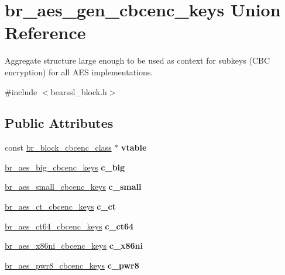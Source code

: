 \hypertarget{unionbr__aes__gen__cbcenc__keys}{}\section{br\+\_\+aes\+\_\+gen\+\_\+cbcenc\+\_\+keys Union Reference}
\label{unionbr__aes__gen__cbcenc__keys}


Aggregate structure large enough to be used as context for subkeys (C\+BC encryption) for all A\+ES implementations.  




{\ttfamily \#include $<$bearssl\+\_\+block.\+h$>$}

\subsection*{Public Attributes}
\begin{DoxyCompactItemize}
\item 
\mbox{\label{unionbr__aes__gen__cbcenc__keys_a5336f4cc210669a4cd5ead782a58d35b}} 
const \hyperlink{bearssl__block_8h_ad0ecff523e21a74dc1143dcfa52aa251}{br\+\_\+block\+\_\+cbcenc\+\_\+class} $\ast$ {\bfseries vtable}
\item 
\mbox{\label{unionbr__aes__gen__cbcenc__keys_aaa9182af4d52e3860792f1728b3b1086}} 
\hyperlink{structbr__aes__big__cbcenc__keys}{br\+\_\+aes\+\_\+big\+\_\+cbcenc\+\_\+keys} {\bfseries c\+\_\+big}
\item 
\mbox{\label{unionbr__aes__gen__cbcenc__keys_ae0a36c46c6fb6d19ccd215ed64338ebf}} 
\hyperlink{structbr__aes__small__cbcenc__keys}{br\+\_\+aes\+\_\+small\+\_\+cbcenc\+\_\+keys} {\bfseries c\+\_\+small}
\item 
\mbox{\label{unionbr__aes__gen__cbcenc__keys_ae9ea6228d55bb3ecd56d0dbf578d12c5}} 
\hyperlink{structbr__aes__ct__cbcenc__keys}{br\+\_\+aes\+\_\+ct\+\_\+cbcenc\+\_\+keys} {\bfseries c\+\_\+ct}
\item 
\mbox{\label{unionbr__aes__gen__cbcenc__keys_ad7e9563e09dab5268f82556123d94cad}} 
\hyperlink{structbr__aes__ct64__cbcenc__keys}{br\+\_\+aes\+\_\+ct64\+\_\+cbcenc\+\_\+keys} {\bfseries c\+\_\+ct64}
\item 
\mbox{\label{unionbr__aes__gen__cbcenc__keys_acd38e27fd56bebe8a4e4d47bd2ee24f5}} 
\hyperlink{structbr__aes__x86ni__cbcenc__keys}{br\+\_\+aes\+\_\+x86ni\+\_\+cbcenc\+\_\+keys} {\bfseries c\+\_\+x86ni}
\item 
\mbox{\label{unionbr__aes__gen__cbcenc__keys_a22ae943e746660f1d69b60a89916800d}} 
\hyperlink{structbr__aes__pwr8__cbcenc__keys}{br\+\_\+aes\+\_\+pwr8\+\_\+cbcenc\+\_\+keys} {\bfseries c\+\_\+pwr8}
\end{DoxyCompactItemize}


